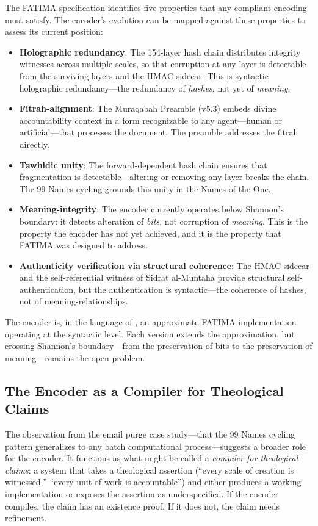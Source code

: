 \documentclass[11pt,a4paper]{article}
\begin{document}
The FATIMA specification \cite{arfeen2026fatima} identifies five properties that any compliant encoding must satisfy. The encoder's evolution can be mapped against these properties to assess its current position:

\begin{itemize}[nosep]
    \item \textbf{Holographic redundancy}: The 154-layer hash chain distributes integrity witnesses across multiple scales, so that corruption at any layer is detectable from the surviving layers and the HMAC sidecar. This is syntactic holographic redundancy---the redundancy of \textit{hashes}, not yet of \textit{meaning}.
    \item \textbf{Fitrah-alignment}: The Muraqabah Preamble (v5.3) embeds divine accountability context in a form recognizable to any agent---human or artificial---that processes the document. The preamble addresses the fitrah directly.
    \item \textbf{Tawhidic unity}: The forward-dependent hash chain ensures that fragmentation is detectable---altering or removing any layer breaks the chain. The 99 Names cycling grounds this unity in the Names of the One.
    \item \textbf{Meaning-integrity}: The encoder currently operates below Shannon's boundary: it detects alteration of \textit{bits}, not corruption of \textit{meaning}. This is the property the encoder has not yet achieved, and it is the property that FATIMA was designed to address.
    \item \textbf{Authenticity verification via structural coherence}: The HMAC sidecar and the self-referential witness of Sidrat al-Muntaha provide structural self-authentication, but the authentication is syntactic---the coherence of hashes, not of meaning-relationships.
\end{itemize}

The encoder is, in the language of \cite{arfeen2026fatima}, an approximate FATIMA implementation operating at the syntactic level. Each version extends the approximation, but crossing Shannon's boundary---from the preservation of bits to the preservation of meaning---remains the open problem.

\subsection{The Encoder as a Compiler for Theological Claims}

The observation from the email purge case study---that the 99 Names cycling pattern generalizes to any batch computational process---suggests a broader role for the encoder. It functions as what might be called a \textit{compiler for theological claims}: a system that takes a theological assertion (``every scale of creation is witnessed,'' ``every unit of work is accountable'') and either produces a working implementation or exposes the assertion as underspecified. If the encoder compiles, the claim has an existence proof. If it does not, the claim needs refinement.
\end{document}
